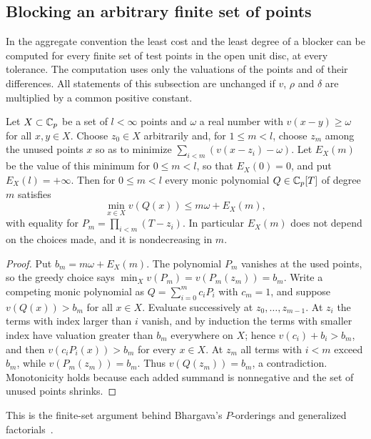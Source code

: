 \subsection{Blocking an arbitrary finite set of points}\label{cost:sec:finite}
{\raggedright{}}

In the aggregate convention the least cost and the least degree of a blocker can be computed
for every finite set of test points in the open unit disc, at every tolerance. The
computation uses only the valuations of the points and of their differences. All statements
of this subsection are unchanged if $v$, $\rho$ and $\delta$ are multiplied by a common
positive constant.

\begin{lemma}\label{cost:lem:greedy}
Let $X\subset\mathbb{C}_p$ be a set of $l<\infty$ points and $\omega$ a real number with
$v(x-y)\ge\omega$ for all $x,y\in X$. Choose $z_0\in X$ arbitrarily and, for $1\le m<l$,
choose $z_m$ among the unused points $x$ so as to minimize
$\sum_{i<m}(v(x-z_i)-\omega)$. Let $E_X(m)$ be the value of this minimum for $0\le m<l$, so
that $E_X(0)=0$, and put $E_X(l)=+\infty$. Then for $0\le m<l$ every monic polynomial
$Q\in\mathbb{C}_p[T]$ of degree $m$ satisfies
\[
 \min_{x\in X}v(Q(x))\le m\omega+E_X(m),
\]
with equality for $P_m=\prod_{i<m}(T-z_i)$. In particular $E_X(m)$ does not depend on the
choices made, and it is nondecreasing in $m$.
\end{lemma}

\begin{proof}
Put $b_m=m\omega+E_X(m)$. The polynomial $P_m$ vanishes at the used points, so the greedy
choice says $\min_Xv(P_m)=v(P_m(z_m))=b_m$. Write a competing monic polynomial as
$Q=\sum_{i=0}^mc_iP_i$ with $c_m=1$, and suppose $v(Q(x))>b_m$ for all $x\in X$. Evaluate
successively at $z_0,\ldots,z_{m-1}$. At $z_i$ the terms with index larger than $i$ vanish,
and by induction the terms with smaller index have valuation greater than $b_m$ everywhere
on $X$; hence $v(c_i)+b_i>b_m$, and then $v(c_iP_i(x))>b_m$ for every $x\in X$. At $z_m$ all
terms with $i<m$ exceed $b_m$, while $v(P_m(z_m))=b_m$. Thus $v(Q(z_m))=b_m$, a
contradiction. Monotonicity holds because each added summand is nonnegative and the set of
unused points shrinks.
\end{proof}

This is the finite-set argument behind Bhargava's $P$-orderings and generalized
factorials~\cite{Bhargava1997Porderings,Bhargava1998Generalized}.

